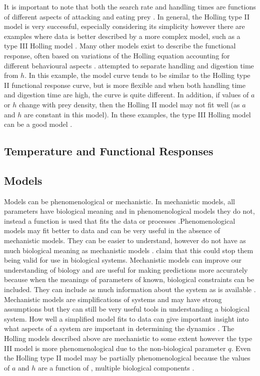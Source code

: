 \documentclass{article}
\begin{document}
It is important to note that both the search rate and handling times are functions of different aspects of attacking and eating prey \cite{Hassel1976TheDeath-Rate}. %
In general, the Holling type II model is very successful, especially considering its simplicity however there are examples where data is better described by a more complex model, such as a type III Holling model \cite{Hassel1976TheDeath-Rate} . 
Many other models exist to describe the functional response, often based on variations of the Holling equation accounting for different behavioural aspects  \cite{Jeschke2002PredatorPrey}. \cite{Jeschke2002PredatorPrey} attempted to separate handling and digestion time from  $h$. In this example, the model curve tends to be similar to the Holling type II functional response curve, but is more flexible and when both handling time and digestion time are high, the curve is quite different. 
In addition, if values of $a$ or $h$ change with prey density, then the Holling II model may not fit well  (as $a$ and $h$ are constant in this model). In these examples, the type III Holling model can be a good model \cite{Hassel1976TheDeath-Rate}. 
\subsection{Temperature and Functional Responses}

\subsection{Models}
Models can be phenomenological or mechanistic. In mechanistic models, all parameters have biological meaning and in phenomenological models they do not, instead a function is used that fits the data or processes \cite{Otto2007AEvolution,Geritz2012MathematicalModels}.Phenomenological models may fit better to data and can be very useful in the absence of mechanistic models. They can be easier to understand, however do not have as much biological meaning as mechanistic models \cite{Otto2007AEvolution}. \cite{Geritz2012MathematicalModels} claim that this could stop them being valid for use in biological systems.  %
Mechanistic models can improve our understanding of biology and are useful for making predictions more accurately because when the meanings of parameters of known, biological constraints can be included. They can include as much information about the system as is available \cite{Otto2007AEvolution,Kendall1999WhyApproaches}. Mechanistic models are simplifications of systems and may have strong assumptions but they can still be very useful tools in understanding a biological system. How well a simplified model fits to data can give important insight into what aspects of a system are important in determining the dynamics \cite{Geritz2012MathematicalModels}.
The Holling models described above are mechanistic to some extent however the type III model is more phenomenological due to the non-biological parameter $q$. Even the Holling type II model may be partially phenomenological because the values of $a$ and $h$ are a function of , multiple biological components \cite{Hassel1976TheDeath-Rate}.%
\end{document}
